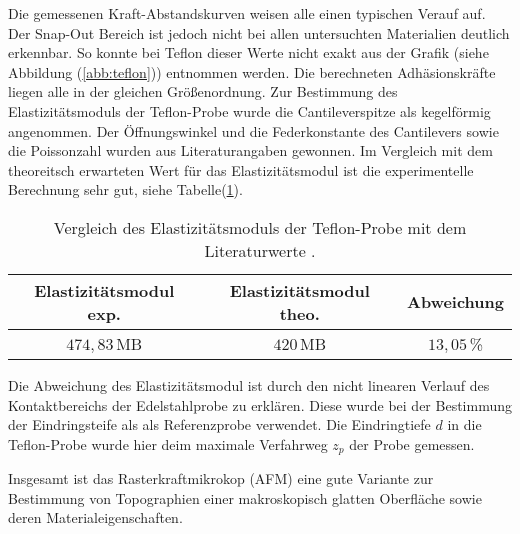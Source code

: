 \bigskip
Die gemessenen Kraft-Abstandskurven weisen alle einen typischen Verauf auf.
Der Snap-Out Bereich ist jedoch nicht bei allen untersuchten Materialien deutlich erkennbar.
So konnte bei Teflon dieser Werte nicht exakt aus der Grafik (siehe Abbildung (\ref{abb:teflon})) entnommen werden.
Die berechneten Adh\"asionskr\"afte liegen alle in der gleichen Gr\"o{\ss}en{\-}ord{\-}nung.
Zur Bestimmung des Elastizit\"atsmoduls der Teflon-Probe wurde die Cantileverspitze als kegelförmig angenommen.
Der Öffnungswinkel und die Federkonstante des Cantilevers sowie die Poissonzahl wurden aus Literaturangaben gewonnen.
Im Vergleich mit dem theoreitsch erwarteten Wert f\"ur das Elastizit\"atsmodul ist die experimentelle Berechnung sehr gut, siehe Tabelle(\ref{tab:auf3d}).
\begin{table}
	\centering
	\caption{Vergleich des Elastizit\"atsmoduls der Teflon-Probe mit dem Literaturwerte \cite{teflon}.}
\begin{tabular}{|ccc|}
	\hline
	{Elastizit\"atsmodul exp.} & {Elastizit\"atsmodul theo.} & {Abweichung} \\
	\hline
	$474,83 \,$MB & $420 \,$MB & $13,05 \,$\% \\
	\hline
\end{tabular}
\label{tab:auf3d}
\end{table}
Die Abweichung des Elastizit\"atsmodul ist durch den nicht linearen Verlauf des Kontaktbereichs der Edelstahlprobe zu erkl\"aren.
Diese wurde bei der Bestimmung der Eindringsteife als als Referenzprobe verwendet.
Die Eindringtiefe $d$ in die Teflon-Probe wurde hier deim maximale Verfahrweg $z_p$ der Probe gemessen.

\bigskip
Insgesamt ist das Rasterkraftmikrokop (AFM) eine gute Variante zur Bestimmung von Topographien einer makroskopisch glatten Oberfläche sowie deren Materialeigenschaften.
